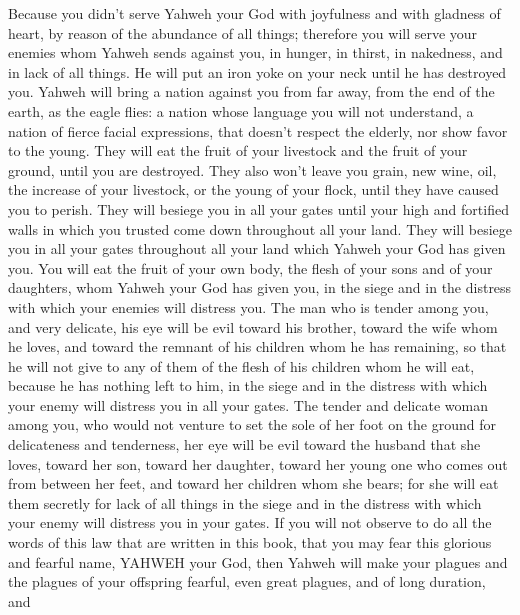  Because you didn't serve Yahweh your God with joyfulness
and with gladness of heart, by reason of the abundance of all things;
 therefore you will serve your enemies whom Yahweh sends
against you, in hunger, in thirst, in nakedness, and in lack of all
things. He will put an iron yoke on your neck until he has destroyed
you.  Yahweh will bring a nation against you from far
away, from the end of the earth, as the eagle flies: a nation whose
language you will not understand,  a nation of fierce
facial expressions, that doesn't respect the elderly, nor show favor to
the young.  They will eat the fruit of your livestock and
the fruit of your ground, until you are destroyed. They also won't leave
you grain, new wine, oil, the increase of your livestock, or the young
of your flock, until they have caused you to perish. 
They will besiege you in all your gates until your high and fortified
walls in which you trusted come down throughout all your land. They will
besiege you in all your gates throughout all your land which Yahweh your
God has given you.  You will eat the fruit of your own
body, the flesh of your sons and of your daughters, whom Yahweh your God
has given you, in the siege and in the distress with which your enemies
will distress you.  The man who is tender among you, and
very delicate, his eye will be evil toward his brother, toward the wife
whom he loves, and toward the remnant of his children whom he has
remaining,  so that he will not give to any of them of
the flesh of his children whom he will eat, because he has nothing left
to him, in the siege and in the distress with which your enemy will
distress you in all your gates.  The tender and delicate
woman among you, who would not venture to set the sole of her foot on
the ground for delicateness and tenderness, her eye will be evil toward
the husband that she loves, toward her son, toward her daughter,
 toward her young one who comes out from between her
feet, and toward her children whom she bears; for she will eat them
secretly for lack of all things in the siege and in the distress with
which your enemy will distress you in your gates.  If you
will not observe to do all the words of this law that are written in
this book, that you may fear this glorious and fearful name, YAHWEH your
God,  then Yahweh will make your plagues and the plagues
of your offspring fearful, even great plagues, and of long duration, and

